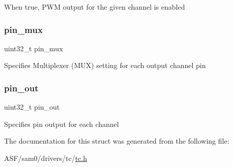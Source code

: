 When {\ttfamily true}, P\+WM output for the given channel is enabled \mbox{\label{structtc__pwm__channel_abd435c343973692ed38c21f0a4680243}} 
\subsubsection{\texorpdfstring{pin\_mux}{pin\_mux}}
{\footnotesize\ttfamily uint32\+\_\+t pin\+\_\+mux}

Specifies Multiplexer (M\+UX) setting for each output channel pin \mbox{\label{structtc__pwm__channel_a7a9c8f94c82e4bd69070967a347f1494}} 
\subsubsection{\texorpdfstring{pin\_out}{pin\_out}}
{\footnotesize\ttfamily uint32\+\_\+t pin\+\_\+out}

Specifies pin output for each channel 

The documentation for this struct was generated from the following file\+:\begin{DoxyCompactItemize}
\item 
A\+S\+F/sam0/drivers/tc/\mbox{\hyperlink{drivers_2tc_2tc_8h}{tc.\+h}}\end{DoxyCompactItemize}
